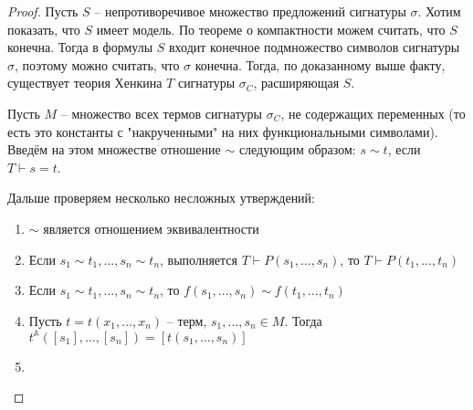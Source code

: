 \begin{proof}
    Пусть $S$ -- непротиворечивое множество предложений сигнатуры $\sigma$. Хотим показать, что $S$ имеет модель. По теореме о компактности можем считать, что $S$ конечна. Тогда в формулы $S$ входит конечное подмножество символов сигнатуры $\sigma$, поэтому можно считать, что $\sigma$ конечна. Тогда, по доказанному выше факту, существует теория Хенкина $T$ сигнатуры $\sigma_C$, расширяющая $S$.

    Пусть $M$ -- множество всех термов сигнатуры $\sigma_C$, не содержащих переменных (то есть это константы с "накрученными" на них функциональными символами). Введём на этом множестве отношение $\sim$ следующим образом: $s\sim t$, если $T\vdash s=t$.

    Дальше проверяем несколько несложных утверждений:
    \begin{enumerate}
        \item $\sim$ является отношением эквивалентности
        \item Если $s_1\sim t_1, \ldots, s_n\sim t_n$, выполняется $T\vdash P(s_1, \ldots, s_n)$, то $T\vdash P(t_1, \ldots, t_n)$
        \item Если $s_1\sim t_1, \ldots, s_n\sim t_n$, то $f(s_1, \ldots, s_n)\sim f(t_1, \ldots, t_n)$
        \item Пусть $t = t(x_1, \ldots, x_n)$ -- терм, $s_1, \ldots, s_n\in M$. Тогда $t^\mathbb{A}([s_1], \ldots, [s_n]) = [t(s_1, \ldots, s_n)]$
        \item %
    \end{enumerate}
\end{proof}
